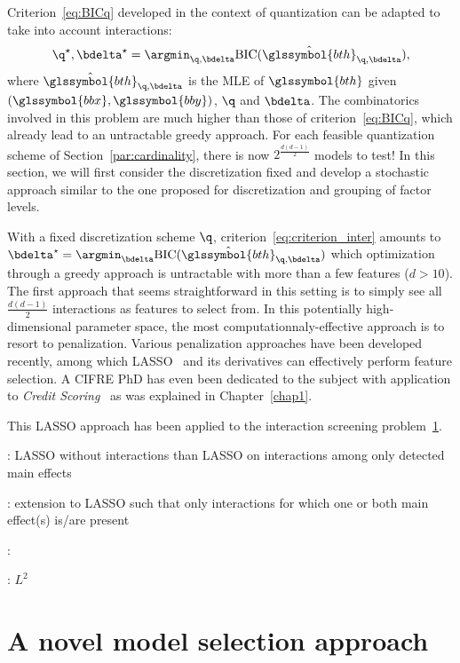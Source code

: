 Criterion~\eqref{eq:BICq} developed in the context of quantization can be adapted to take into account interactions:
\begin{equation} \label{eq:criterion_inter}
\q^\star,\bdelta^\star = \argmin_{\q,\bdelta} \text{BIC}(\hat{\glssymbol{bth}}_{\q,\bdelta}),
\end{equation}
where $\hat{\glssymbol{bth}}_{\q,\bdelta}$ is the MLE of $\glssymbol{bth}$ given $(\glssymbol{bbx},\glssymbol{bby})$, $\q$ and $\bdelta$. The combinatorics involved in this problem are much higher than those of criterion~\eqref{eq:BICq}, which already lead to an untractable greedy approach. For each feasible quantization scheme of Section~\ref{par:cardinality}, there is now $2^{\frac{d(d-1)}{2}}$ models to test! In this section, we will first consider the discretization fixed and develop a stochastic approach similar to the one proposed for discretization and grouping of factor levels.

With a fixed discretization scheme $\q$, criterion~\ref{eq:criterion_inter} amounts to $\bdelta^\star = \argmin_{\bdelta} \text{BIC}(\hat{\glssymbol{bth}}_{\q,\bdelta})$ which optimization through a greedy approach is untractable with more than a few features ($d > 10$). The first approach that seems straightforward in this setting is to simply see all $\frac{d(d-1)}{2}$ interactions as features to select from. In this potentially high-dimensional parameter space, the most computationnaly-effective approach is to resort to penalization. Various penalization approaches have been developed recently, among which LASSO~\cite{tibshirani1996regression} and its derivatives can effectively perform feature selection. A CIFRE PhD has even been dedicated to the subject with application to \textit{Credit Scoring}~\cite{vital2016} as was explained in Chapter~\ref{chap1}.

This LASSO approach has been applied to the interaction screening problem~\ref{}.


\cite{wu2009genome} : LASSO without interactions than LASSO on interactions among only detected main effects

\cite{bien2013lasso} : extension to LASSO such that only interactions for which one or both main effect(s) is/are present

\cite{wang2012interaction} : 

\cite{park2007penalized} : $L^2$

\section{A novel model selection approach}


